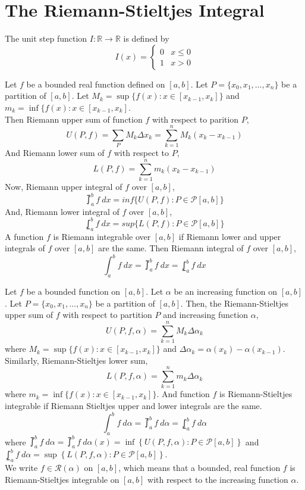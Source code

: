 \section{The Riemann-Stieltjes Integral}
\begin{definition}
	The unit step function $I : \mathbb{R} \to \mathbb{R}$ is defined by
	\[ I(x) = \begin{cases} 0 & x \le 0 \\ 1 & x > 0 \end{cases} \] 
\end{definition}
\begin{definition}
	Let $f$ be a bounded real function defined on $[a,b]$.
	Let $P = \{x_0,x_1,\dots,x_n\}$ be a partition of $[a,b]$.
	Let $M_k = \sup \{ f(x) : x \in [x_{k-1},x_k] \}$ and $m_k = \inf \{ f(x) : x \in [x_{k-1},x_k]$.\\

	Then Riemann upper sum of function $f$ with respect to parition $P$,
	\[ U(P,f) = \sum_P M_k \Delta x_k = \sum_{k=1}^n M_k (x_k-x_{k-1}) \]
	And Riemann lower sum of $f$ with respect to $P$,
	\[ L(P,f) = \sum_{k=1}^n m_k (x_k-x_{k-1}) \]
	Now, Riemann upper integral of $f$ over $[a,b]$,
	\[ \upint_a^b f\ dx = inf \{ U(P,f) : P \in \mathscr{P}[a,b] \} \]
	And, Riemann lower integral of $f$ over $[a,b]$,
	\[ \lowint_a^b f\ dx = sup \{ L(P,f) : P \in \mathscr{P}[a,b] \} \]
	A function $f$ is Riemann integrable over $[a,b]$ if Riemann lower and upper integrals of $f$ over $[a,b]$ are the same.
	Then Riemann integral of $f$ over $[a,b]$,
	\[ \int_a^b f\ dx = \upint_a^b f\ dx = \lowint_a^b f\ dx \]
\end{definition}
\begin{definition}
	Let $f$ be a bounded function on $[a,b]$.
	Let $\alpha$ be an increasing function on $[a,b]$.
	Let $P = \{ x_0,x_1,\dots,x_n\}$ be a partition of $[a,b]$.
	Then, the Riemann-Stieltjes upper sum of $f$ with respect to partition $P$ and increasing function $\alpha$,
	\[ U(P,f,\alpha) = \sum_{k=1}^n M_k \Delta \alpha_k \]
	where $M_k = \sup \{ f(x) : x \in [x_{k-1},x_k] \}$ and $\Delta \alpha_k = \alpha(x_k) - \alpha(x_{k-1})$.
	Similarly, Riemann-Stieltjes lower sum,
	\[ L(P,f,\alpha) = \sum_{k=1}^n m_k \Delta \alpha_k \]
	where $m_k = \inf \{ f(x) : x \in [x_{k-1},x_k] \}$.
	And function $f$ is Riemann-Stieltjes integrable if Riemann Stieltjes upper and lower integrals are the same.
	\[ \int_a^b f\ d\alpha = \upint_a^b f\ d\alpha = \lowint_a^b f\ d\alpha \]
	where $\displaystyle \upint_a^b f\ d\alpha = \upint_a^b f\ d\alpha(x) = \inf \left\{ U(P,f,\alpha) : P \in \mathscr{P}[a,b] \right\}$ and\\
	$\displaystyle \lowint_a^b f\ d\alpha = \sup \left\{ L(P,f,\alpha) : P \in \mathscr{P}[a,b] \right\}$.\\

	We write $f \in \mathscr{R}(\alpha)$ on $[a,b]$, which means that a bounded, real function $f$ is Riemann-Stieltjes integrable on $[a,b]$ with respect to the increasing function $\alpha$.
\end{definition}

